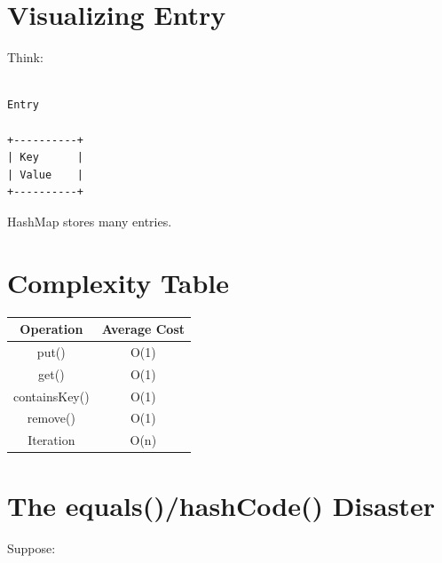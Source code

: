 \documentclass[11pt,a4paper]{book}
\begin{document}

\section{Visualizing Entry}

Think:

\begin{verbatim}

Entry

+----------+
| Key      |
| Value    |
+----------+

\end{verbatim}


HashMap stores many entries.


\section{Complexity Table}

\begin{center}

\begin{tabular}{|c|c|}
\hline
Operation & Average Cost \\
\hline

put()
&
O(1)
\\
\hline

get()
&
O(1)
\\
\hline

containsKey()
&
O(1)
\\
\hline

remove()
&
O(1)
\\
\hline

Iteration
&
O(n)
\\
\hline

\end{tabular}

\end{center}


\section{The equals()/hashCode() Disaster}

Suppose:
\end{document}
